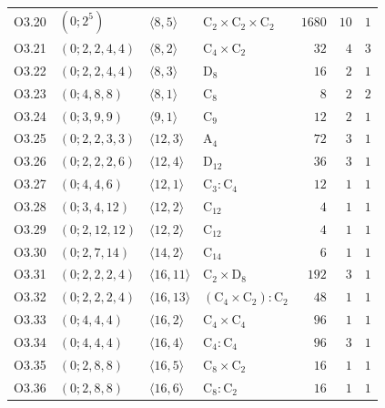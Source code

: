 \begin{center}
\begin{longtable}{|l|l|l|l|r|r|r|}
O3.20 & $(0; 2^5)$ & $\langle 8, 5 \rangle$ & {\small $\mathrm{C}_{2} \times \mathrm{C}_{2} \times \mathrm{C}_{2}$} & $1680$ & $10$ & $1$ \\
O3.21 & $(0; 2, 2, 4, 4)$ & $\langle 8, 2 \rangle$ & {\small $\mathrm{C}_{4} \times \mathrm{C}_{2}$} & $32$ & $4$ & $3$ \\
O3.22 & $(0; 2, 2, 4, 4)$ & $\langle 8, 3 \rangle$ & {\small $ \mathrm{D}_{8}$} & $16$ & $2$ & $1$ \\
O3.23 & $(0; 4, 8, 8)$ & $\langle 8, 1 \rangle$ & {\small $\mathrm{C}_{8}$} & $8$ & $2$ & $2$ \\
O3.24 & $(0; 3, 9, 9)$ & $\langle 9, 1 \rangle$ & {\small $\mathrm{C}_{9}$} & $12$ & $2$ & $1$ \\
O3.25 & $(0; 2, 2, 3, 3)$ & $\langle 12, 3 \rangle$ & {\small $\mathrm{A}_{4}$} & $72$ & $3$ & $1$ \\
O3.26 & $(0; 2, 2, 2, 6)$ & $\langle 12, 4 \rangle$ & {\small $ \mathrm{D}_{12}$} & $36$ & $3$ & $1$ \\
O3.27 & $(0; 4, 4, 6)$ & $\langle 12, 1 \rangle$ & {\small $\mathrm{C}_{3} \colon \mathrm{C}_{4}$} & $12$ & $1$ & $1$ \\
O3.28 & $(0; 3, 4, 12)$ & $\langle 12, 2 \rangle$ & {\small $\mathrm{C}_{12}$} & $4$ & $1$ & $1$ \\
O3.29 & $(0; 2, 12, 12)$ & $\langle 12, 2 \rangle$ & {\small $\mathrm{C}_{12}$} & $4$ & $1$ & $1$ \\
O3.30 & $(0; 2, 7, 14)$ & $\langle 14, 2 \rangle$ & {\small $\mathrm{C}_{14}$} & $6$ & $1$ & $1$ \\
O3.31 & $(0; 2, 2, 2, 4)$ & $\langle 16, 11 \rangle$ & {\small $\mathrm{C}_{2} \times \mathrm{D}_{8}$} & $192$ & $3$ & $1$ \\
O3.32 & $(0; 2, 2, 2, 4)$ & $\langle 16, 13 \rangle$ & {\small $(\mathrm{C}_{4} \times \mathrm{C}_{2}) \colon \mathrm{C}_{2}$} & $48$ & $1$ & $1$ \\
O3.33 & $(0; 4, 4, 4)$ & $\langle 16, 2 \rangle$ & {\small $\mathrm{C}_{4} \times \mathrm{C}_{4}$} & $96$ & $1$ & $1$ \\
O3.34 & $(0; 4, 4, 4)$ & $\langle 16, 4 \rangle$ & {\small $\mathrm{C}_{4} \colon \mathrm{C}_{4}$} & $96$ & $3$ & $1$ \\
O3.35 & $(0; 2, 8, 8)$ & $\langle 16, 5 \rangle$ & {\small $\mathrm{C}_{8} \times \mathrm{C}_{2}$} & $16$ & $1$ & $1$ \\
O3.36 & $(0; 2, 8, 8)$ & $\langle 16, 6 \rangle$ & {\small $\mathrm{C}_{8} \colon \mathrm{C}_{2}$} & $16$ & $1$ & $1$ \\

\end{longtable}
\end{center}
